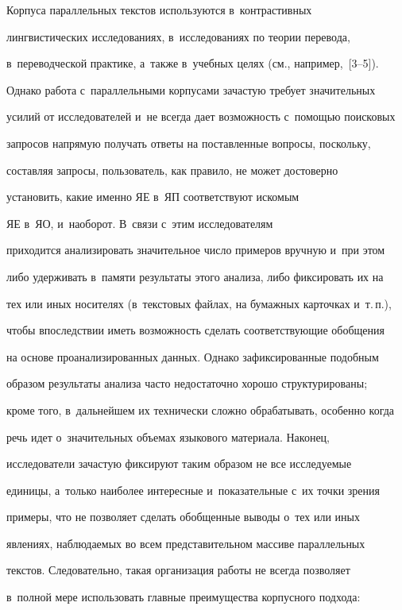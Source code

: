    


   Корпуса параллельных текстов используются в~контрастивных 


лингвистических исследованиях, в~исследованиях по тео\-рии перевода, 


в~переводческой прак\-ти\-ке, а~так\-же в~учеб\-ных целях (см., например,~[3--5]). 


Однако работа с~параллельными корпусами за\-час\-тую требует значительных 


усилий от исследователей и~не всегда дает воз\-мож\-ность с~по\-мощью поисковых 


запросов напрямую получать ответы на поставленные вопросы, поскольку, 


составляя запросы, пользователь, как правило, не может достоверно 


установить, какие именно ЯЕ в~ЯП соответствуют искомым 


ЯЕ в~ЯО, и~наоборот. В~связи с~этим исследователям 


приходится анализировать значительное чис\-ло примеров вруч\-ную и~при этом 


либо удерживать в~памяти результаты этого анализа, либо фиксировать их на 


тех или иных носителях (в~текс\-то\-вых файлах, на бумажных карточках и~т.\,п.), 


чтобы впоследствии иметь воз\-мож\-ность сделать со\-от\-вет\-ст\-ву\-ющие обобщения 


на основе проанализированных данных. Однако зафиксированные по\-доб\-ным 


образом результаты анализа час\-то недостаточно хорошо структурированы; 


кроме того, в~дальнейшем их технически слож\-но обрабатывать, особенно когда 


речь идет о~значительных объемах языкового материала. Наконец, 


исследователи за\-час\-тую фиксируют таким образом не все ис\-сле\-ду\-емые 


единицы, а~только наиболее интересные и~показательные с~их точ\-ки зрения 


примеры, что не поз\-во\-ля\-ет сделать обобщенные выводы о~тех или иных 


явлениях, наблюдаемых во всем пред\-ста\-ви\-тель\-ном массиве параллельных 


текстов. Следовательно, такая организация работы не всегда позволяет 


в~пол\-ной мере использовать главные преимущества корпусного подхода: 


